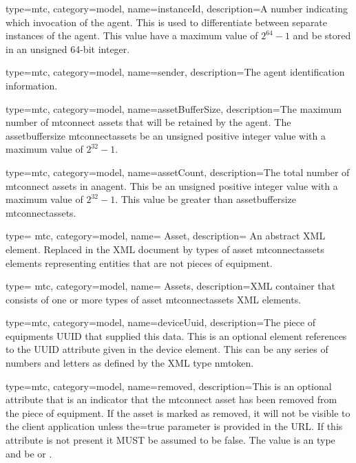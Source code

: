 {
  type=mtc,
  category=model,
  name={instanceId},
  description={A number indicating which invocation of the \gls{agent}. This is used to differentiate between separate instances of the \gls{agent}. This value \MUST have a maximum value of $2^{64}-1$ and \MUST be stored in an unsigned 64-bit integer. }
}


{
  type=mtc,
  category=model,
  name={sender},
  description={The \gls{agent} identification information. }
}


{
  type=mtc,
  category=model,
  name={assetBufferSize},
  description={The maximum number of \glspl{mtconnect asset} that will be retained by the \gls{agent}. The \gls{assetbuffersize mtconnectassets} \MUST be an unsigned positive integer value with a maximum value of $2^{32}-1$. }
}


{
  type=mtc,
  category=model,
  name={assetCount},
  description={The total number of \glspl{mtconnect asset} in an\gls{agent}. This \MUST be an unsigned positive integer value with a maximum value of $2^{32}-1$. This value \MUSTNOT be greater than \gls{assetbuffersize mtconnectassets}.}
}


{
  type= mtc,
  category=model,
  name= {Asset},
  description= {An abstract XML element. Replaced in the XML document by types of \gls{asset mtconnectassets} elements representing entities that are not pieces of equipment.}
}

{
  type= mtc,
  category=model,
  name= {Assets},
  description={XML container that consists of one or more types of \gls{asset mtconnectassets} XML elements. }
}


{
  type=mtc,
  category=model,
  name={deviceUuid},
  description={The piece of equipments UUID that supplied this data. This is an optional element references to the UUID attribute given in the \gls{device} element. This can be any series of numbers and letters as defined by the XML type \gls{nmtoken}.}
}


{
  type=mtc,
  category=model,
  name={removed},
  description={This is an optional attribute that is an indicator that the \gls{mtconnect asset} has been removed from the piece of equipment. If the \gls{asset} is marked as removed,
  it will not be visible to the client application unless the=true parameter is provided in the URL. If this attribute is not present it MUST be assumed to be false. The value is an  type and \MUST be  or .}
}


